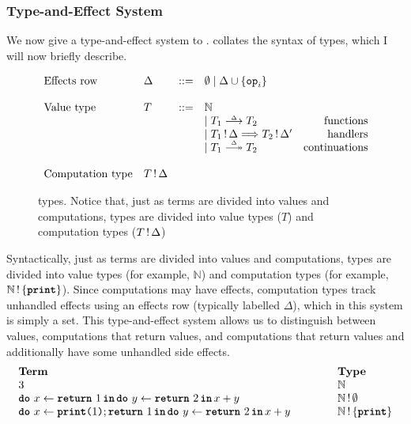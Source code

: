 \subsubsection{Type-and-Effect System}
We now give a type-and-effect system to \efflang{}.  collates the syntax of \efflang{} types, which I will now briefly describe. 

\begin{figure}
  \begin{eff-desc}
  $\begin{array}{llllr}
    \text{Effects row} & \Delta & ::= & \emptyset \mid \Delta \cup \{ \texttt{op}_i \} \\ \\
    \text{Value type} & T & ::= & \mathbb{N} & \\
                              &&& \mid \functionType{T_1}{T_2} & \text{functions}\\
                              &&& \mid \handlerType{\effectType{T_1}}{\effectType[\Delta']{T_2}} & \text{handlers} \\
                              &&& \mid \continuationType{T_1}{T_2} & \text{continuations}\\ \\
    \text{Computation type} & \effectType{T}
  \end{array}$
  \end{eff-desc}
  \caption{\efflang{} types. Notice that, just as terms are divided into values and computations, types are divided into value types ($T$) and computation types ($\effectType{T}$)}
  \label{fig:efflang-type-syntax}
\end{figure}

Syntactically, just as terms are divided into values and computations, types are divided into value types (for example, $\mathbb{N}$) and computation types (for example, $\effectType[\{\textbf{\texttt{print}} \}]{\mathbb{N}}$). Since computations may have effects, computation types track unhandled effects using an effects row (typically labelled $\Delta$), which in this system is simply a set. This type-and-effect system allows us to distinguish between values, computations that return values, and computations that return values and additionally have some unhandled side effects.
\[
\begin{array}{lll}
  \textbf{Term} &\hspace{8mm}& \textbf{Type} \\
  3 && \mathbb{N} \\ 
  \bind{x}{\return{1}}{\bind{y}{\return{2}}{x + y}} &&  \effectType[\emptyset]{\mathbb{N}} \\ 
  \bind{x}{\texttt{\textbf{print}($1$)}; \return{1}}{\bind{y}{\return{2}}{x + y}} &&  \effectType[\{ \texttt{\textbf{print}}\}]{\mathbb{N}} \\ 
\end{array}
\]

